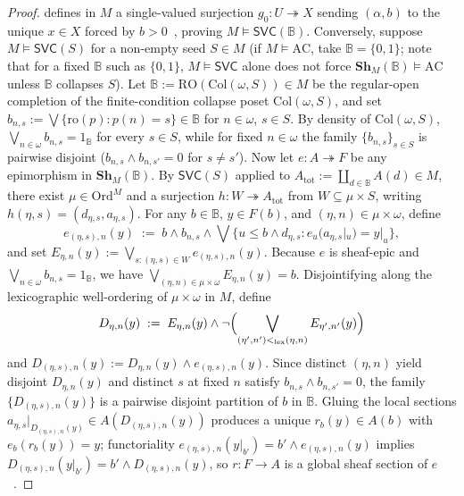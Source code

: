 \documentclass[10pt,twoside,openright]{book}
\theoremstyle{crmplain}
\theoremstyle{crmdef}
\theoremstyle{crmremark}
\begin{document}
\begin{proof}
defines in $M$ a single-valued surjection $g_0 : U \twoheadrightarrow X$ sending $(\alpha, b)$ to the unique $x \in X$ forced by $b > 0$~\cite[Theorem~4.2]{Blass79}, proving $M \models \mathsf{SVC}(\mathbb{B})$. Conversely, suppose $M \models \mathsf{SVC}(S)$ for a non-empty seed $S \in M$ (if $M \models \mathrm{AC}$, take $\mathbb{B} = \{0,1\}$; note that for a fixed $\mathbb{B}$ such as $\{0,1\}$, $M \models \mathsf{SVC}$ alone does not force $\mathbf{Sh}_M(\mathbb{B}) \models \mathrm{AC}$ unless $\mathbb{B}$ collapses $S$). Let $\mathbb{B} := \mathrm{RO}(\mathrm{Col}(\omega, S)) \in M$ be the regular-open completion of the finite-condition collapse poset $\mathrm{Col}(\omega, S)$, and set $b_{n,s} := \bigvee \{\mathrm{ro}(p) : p(n) = s\} \in \mathbb{B}$ for $n \in \omega$, $s \in S$. By density of $\mathrm{Col}(\omega, S)$, $\bigvee_{n \in \omega} b_{n,s} = 1_{\mathbb{B}}$ for every $s \in S$, while for fixed $n \in \omega$ the family $\{b_{n,s}\}_{s \in S}$ is pairwise disjoint ($b_{n,s} \wedge b_{n,s'} = 0$ for $s \neq s'$). Now let $e : A \twoheadrightarrow F$ be any epimorphism in $\mathbf{Sh}_M(\mathbb{B})$. By $\mathsf{SVC}(S)$ applied to $A_{\mathrm{tot}} := \coprod_{d \in \mathbb{B}} A(d) \in M$, there exist $\mu \in \mathrm{Ord}^M$ and a surjection $h : W \twoheadrightarrow A_{\mathrm{tot}}$ from $W \subseteq \mu \times S$, writing $h(\eta, s) = (d_{\eta, s}, a_{\eta, s})$. For any $b \in \mathbb{B}$, $y \in F(b)$, and $(\eta, n) \in \mu \times \omega$, define
\[
  e_{(\eta, s), n}(y) \;:=\; b \wedge b_{n,s} \wedge \bigvee\bigl\{u \le b \wedge d_{\eta,s} : e_u(a_{\eta,s}|_u) = y|_u\bigr\},
\]
and set $E_{\eta, n}(y) := \bigvee_{s : (\eta, s) \in W} e_{(\eta, s), n}(y)$. Because $e$ is sheaf-epic and $\bigvee_{n \in \omega} b_{n,s} = 1_{\mathbb{B}}$, we have $\bigvee_{(\eta, n) \in \mu \times \omega} E_{\eta, n}(y) = b$. Disjointifying along the lexicographic well-ordering of $\mu \times \omega$ in $M$, define
\[
  D_{\eta, n}(y) \;:=\; E_{\eta, n}(y) \wedge \neg\Bigl(\bigvee_{(\eta', n') <_{\mathrm{lex}} (\eta, n)} E_{\eta', n'}(y)\Bigr)
\]
and $D_{(\eta, s), n}(y) := D_{\eta, n}(y) \wedge e_{(\eta, s), n}(y)$. Since distinct $(\eta, n)$ yield disjoint $D_{\eta, n}(y)$ and distinct $s$ at fixed $n$ satisfy $b_{n,s} \wedge b_{n,s'} = 0$, the family $\{D_{(\eta,s), n}(y)\}$ is a pairwise disjoint partition of $b$ in $\mathbb{B}$. Gluing the local sections $a_{\eta, s}|_{D_{(\eta, s), n}(y)} \in A(D_{(\eta, s), n}(y))$ produces a unique $r_b(y) \in A(b)$ with $e_b(r_b(y)) = y$; functoriality $e_{(\eta, s), n}(y|_{b'}) = b' \wedge e_{(\eta, s), n}(y)$ implies $D_{(\eta, s), n}(y|_{b'}) = b' \wedge D_{(\eta, s), n}(y)$, so $r : F \to A$ is a global sheaf section of $e$~\cite{Blass79,Usuba21}.
\end{proof}
\end{document}

